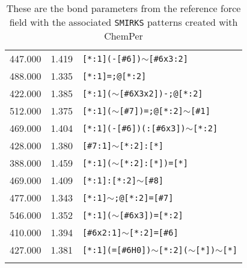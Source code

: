 \begin{longtable}{>{\baselineskip=10pt}p{} >{\baselineskip=10pt}p{} >{\baselineskip=10pt}p{}}
447.000 & 1.419 & \texttt{[*:1](-[\#6])$\sim$[\#6x3:2]} \\ 
488.000 & 1.335 & \texttt{[*:1]=;@[*:2]} \\ 
422.000 & 1.385 & \texttt{[*:1]($\sim$[\#6X3x2])-;@[*:2]} \\ 
512.000 & 1.375 & \texttt{[*:1]($\sim$[\#7])=;@[*:2]$\sim$[\#1]} \\ 
469.000 & 1.404 & \texttt{[*:1](-[\#6])(:[\#6x3])$\sim$[*:2]} \\ 
428.000 & 1.380 & \texttt{[\#7:1]$\sim$[*:2]:[*]} \\ 
388.000 & 1.459 & \texttt{[*:1]($\sim$[*:2]:[*])=[*]} \\ 
469.000 & 1.409 & \texttt{[*:1]:[*:2]$\sim$[\#8]} \\ 
477.000 & 1.343 & \texttt{[*:1]$\sim$;@[*:2]=[\#7]} \\ 
546.000 & 1.352 & \texttt{[*:1]($\sim$[\#6x3])=[*:2]} \\ 
410.000 & 1.394 & \texttt{[\#6x2:1]$\sim$[*:2]=[\#6]} \\ 
427.000 & 1.381 & \texttt{[*:1](=[\#6H0])$\sim$[*:2]($\sim$[*])$\sim$[*]} \\ 
\caption{These are the bond parameters from the reference force field with the associated \texttt{SMIRKS} patterns created with ChemPer} 
\label{tab:protein_bond}
\end{longtable}


